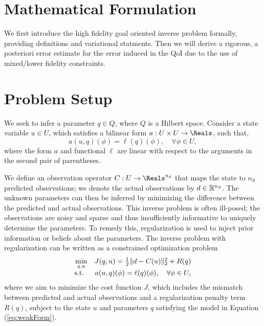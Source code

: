 \section{Mathematical Formulation}\label{sect:form}
%
We first introduce the high fidelity goal oriented inverse problem formally, providing definitions and variational statments. Then we will derive a rigorous, a posteriori error estimate for the error induced in the QoI due to the use of mixed/lower fidelity constraints. 

\section{Problem Setup}  \label{sec:setup}

We seek to infer a parameter $q \in Q$, where $Q$ is a Hilbert space. Consider a state variable $u \in U$, which satisfies a bilinear form $a:U \times U \to \Reals$, such that,
\begin{equation}
a(u,q)(\phi)=\ell(q)(\phi),\quad\forall\phi\in U,
\label{eq:weakForm}
\end{equation}
where the form $a$ and functional $\ell$ are linear with respect to the arguments in the second pair of parentheses. 

We define an observation operator $C:U\to\Reals^{n_d}$ that maps the state to $n_d$ predicted observations; we denote the actual observations by $d\in{\mathbb{R}}^{n_d}$. The unknown parameters can then be inferred by minimizing the difference between the predicted and actual observations. This inverse problem is often ill-posed; the observations are noisy and sparse and thus insufficiently informative to uniquely determine the parameters. To remedy this, regularization is used to inject prior information or beliefs about the parameters. The inverse problem with regularization can be written as a constrained optimization problem
\begin{equation}
\begin{array}{r@{}c}
\min\limits_{q,u} & \quad J(q,u)=\frac{1}{2}\|d-C(u)\|_2^2 + R(q) \\ \textrm{s.t. }& \quad a(u,q)(\phi)=\ell(q)(\phi),\quad\forall\phi\in U,
\end{array}
\label{eq:invOpt}
\end{equation}
where we aim to minimize the cost function $J$, which includes the mismatch between predicted and actual observations and a regularization penalty term $R(q)$, subject to the state $u$ and parameters $q$ satisfying the model in Equation (\ref{eq:weakForm}).


